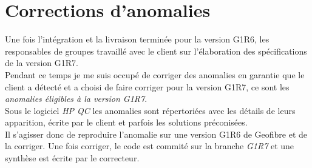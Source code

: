 \section{Corrections d'anomalies}
Une fois l'intégration et la livraison terminée pour la version G1R6, les responsables de groupes travaillé avec le client sur l'élaboration des spécifications de la version G1R7.
\\Pendant ce temps je me suis occupé de corriger des anomalies en garantie que le client a détecté et a choisi de faire corriger pour la version G1R7, ce sont les \textit{anomalies éligibles à la version G1R7}.
\\Sous le logiciel \textit{HP QC} les anomalies sont répertoriées avec les détails de leurs apparition, écrite par le client et parfois les solutions préconisées.
\\Il s'agisser donc de reproduire l'anomalie sur une version G1R6 de Geofibre et de la corriger. Une fois corriger, le code est commité sur la branche \textit{G1R7} et une synthèse est écrite par le correcteur.
\\\\
\noindent%
